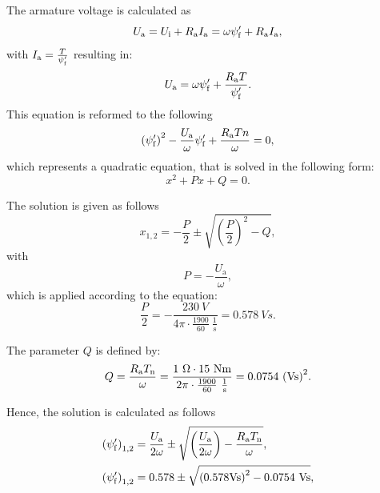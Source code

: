 \begin{solutionblock}
    The armature voltage is calculated as
    \begin{equation}
        \Ua = \Ui + \Ra \Ia
        = \omega \psi_{\mathrm{f}}' + \Ra I_{\mathrm{a}},
    \end{equation}
    with $\Ia = \frac{T}{\psi_{\mathrm{f}}'}$ resulting in:
    \begin{equation}
        \Ua = \omega \psi_{\mathrm{f}}' + \frac{\Ra T}{\psi_{\mathrm{f}}'}.
    \end{equation}
    This equation is reformed to the following
    \begin{equation}
        \left(\psi_{\mathrm{f}}' \right)^2 - \frac{U_{\mathrm{a}}}{\omega} \psi_{\mathrm{f}}' + \frac{\Ra Tn}{\omega} = 0,
    \end{equation}
    which represents a quadratic equation, that is solved in the following form:
    \begin{equation}
        x^2 + P x + Q = 0.
    \end{equation}

    The solution is given as follows
    \begin{equation}
        x_{\mathrm{1,2}} = -\frac{P}{2} \pm \sqrt{\left(\frac{P}{2}\right)^2 - Q},
    \end{equation}
    with 
    \begin{equation}
        P = -\frac{U_{\mathrm{a}}}{\omega},
    \end{equation}
    which is applied according to the equation:
    \begin{equation}
        \frac{P}{2} = - \frac{230 \ \si{V}}{4 \pi \cdot \frac{1900}{60} \ \si{\frac{1}{s}}}
        = 0.578 \ \si{Vs}.
    \end{equation}

    The parameter $Q$ is defined by:
    \begin{equation}
        Q = \frac{\Ra \Tn}{\omega}
        = \frac{1 \ \si{\Omega} \cdot 15 \ \si{Nm}}{2 \pi \cdot \frac{1900}{60} \ \si{\frac{1}{s}}}
        = 0.0754 \ \si{(Vs)^2}.
    \end{equation}


    Hence, the solution is calculated as follows
    \begin{align}
        \begin{split}
            \left(\psi_{\mathrm{f}}' \right)_{\mathrm{1,2}}
            &= \frac{U_{\mathrm{a}}}{2 \omega} \pm \sqrt{\left( \frac{U_{\mathrm{a}}}{2 \omega}\right) - \frac{\Ra \Tn}{\omega}}, \\
            \left(\psi_{\mathrm{f}}' \right)_{\mathrm{1,2}}
            &= 0.578 \pm \sqrt{\left(0.578 \si{Vs} \right)^2 - 0.0754 \ \si{Vs}},
        \end{split}
    \end{align}


\end{solutionblock}
